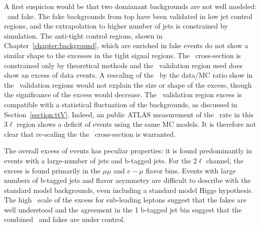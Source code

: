 A first suspicion would be that two domianant backgrounds are not well modeled: \ttV\ and fake. The fake backgrounds from top have been validated in low jet control regions, and the extrapolation to higher number of jets is constrained by simulation. The anti-tight control regions, shown in Chapter~\ref{chapter:background}, which are enriched in fake events do not show a similar shape to the excesses in the tight signal regions. The \ttV\ cross-section is constrained only by theoretical methods and the \ttZ\ validation region used does show an excess of data events. A rescaling of the \ttV\ by the data/MC ratio show in the \ttZ\ validation regions would not explain the size or shape of the excess, though the significance of the excess would decrease. The \ttZ\ validation region excess is compatible with a statistical fluctuation of the backgrounds, as discussed in Section~\ref{section:ttV}. Indeed, an public ATLAS measurement of the \ttZ\ rate in this 3$\ell$ region shows a deficit of events \cite{ATLAS-CONF-2012-126} using the same MC models. It is therefore not clear that re-scaling the the \ttV\ cross-section is warranted. 

The overall excess of events has peculiar properties: it is found predominantly in events with a large-number of jets and b-tagged jets.  For the 2$\ell$ channel, the excess is found primarily in the $\mu\mu$ and $e-\mu$ flavor bins. Events with large numbers of b-tagged jets and flavor asymmetry are difficult to describe with the standard model backgrounds, even including a standard model Higgs hypothesis. The high \pt\ scale of the excess for sub-leading leptons suggest that the fakes are well understood and the agreement in the 1 b-tagged jet bin suggest that the combined \ttV\ and fakes are under control. 


